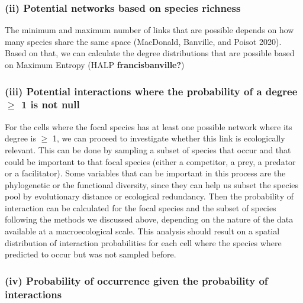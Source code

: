 \documentclass[11pt]{article}
\begin{document}
\hypertarget{ii-potential-networks-based-on-species-richness}{%
\subsubsection{(ii) Potential networks based on species
richness}\label{ii-potential-networks-based-on-species-richness}}

The minimum and maximum number of links that are possible depends on how
many species share the same space (MacDonald, Banville, and Poisot
2020). Based on that, we can calculate the degree distributions that are
possible based on Maximum Entropy (HALP \textbf{francisbanville?})

\hypertarget{iii-potential-interactions-where-the-probability-of-a-degree-ge-1-is-not-null}{%
\subsubsection{\texorpdfstring{(iii) Potential interactions where the
probability of a degree \(\ge\) 1 is not
null}{(iii) Potential interactions where the probability of a degree \textbackslash ge 1 is not null}}\label{iii-potential-interactions-where-the-probability-of-a-degree-ge-1-is-not-null}}

For the cells where the focal species has at least one possible network
where its degree is \(\ge\) 1, we can proceed to investigate whether
this link is ecologically relevant. This can be done by sampling a
subset of species that occur and that could be important to that focal
species (either a competitor, a prey, a predator or a facilitator). Some
variables that can be important in this process are the phylogenetic or
the functional diversity, since they can help us subset the species pool
by evolutionary distance or ecological redundancy. Then the probability
of interaction can be calculated for the focal species and the subset of
species following the methods we discussed above, depending on the
nature of the data available at a macroecological scale. This analysis
should result on a spatial distribution of interaction probabilities for
each cell where the species where predicted to occur but was not sampled
before.

\hypertarget{iv-probability-of-occurrence-given-the-probability-of-interactions}{%
\subsubsection{(iv) Probability of occurrence given the probability of
interactions}\label{iv-probability-of-occurrence-given-the-probability-of-interactions}}
\end{document}
